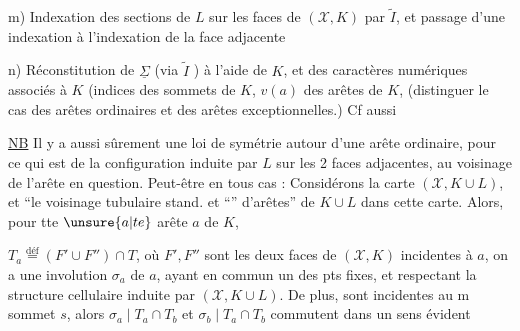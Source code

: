 
m) Indexation des sections de $L$ sur les faces de $(\mathcal X,K)$  par $\widetilde I$, et passage d'une indexation à l'indexation de la face adjacente

n) Réconstitution de  $\underline{\Sigma}$ (via $\widetilde I$ \unsure{---|\ldots}) à l'aide de $K$, et des caractères numériques associés à $K$ (indices des  sommets de $K$,  $v(a)$ des arêtes  de $K$,  (distinguer le cas des arêtes ordinaires et des arêtes exceptionnelles.) Cf aussi

\uline{NB} Il y a aussi sûrement une loi de symétrie autour d'une arête ordinaire, pour ce qui est de la configuration induite par $L$ sur les 2 faces adjacentes, au voisinage de l'arête en question. Peut-être  en tous cas : Considérons la carte $(\mathcal X,K\cup L)$, et ``le voisinage tubulaire stand. et ``'' d'arêtes'' de   $K\cup L$ dans cette carte.  Alors, pour tte $\unsure{a|te}$ arête $a$ de $K$, 


$T_a\overset{\mathrm{déf}}{=}(F'\cup F'')\cap T$, où $F',F''$ sont les deux faces de $(\mathcal X,K)$ incidentes à $a$, on a une involution \deleted{\unsure{$\varphi$}} $\sigma_a$ de $a$, ayant en commun un des pts fixes, et respectant la structure cellulaire induite par $(\mathcal X,K\cup L)$. De plus,  sont incidentes au m sommet $s$, alors $\sigma_a\mid T_a\cap T_b$ et $\sigma_b\mid T_a\cap T_b$ commutent dans un sens évident

